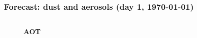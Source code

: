 \documentclass[aspectratio=169, 10pt]{beamer}
\begin{document}
\begin{frame}
\frametitle{Forecast: dust and aerosols (day 1, {\AdvanceDate[+1]\today})}

\begin{columns}
\begin{column}{0.33\textwidth}


\vspace{-3.5cm}
\begin{figure}
\textbf{AOT} \vspace{0.0cm}\\
\end{figure}


\end{column}
\end{columns}
\end{frame}
\end{document}
